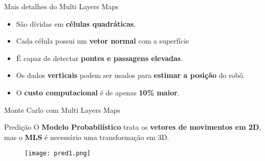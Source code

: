 

\begin{frame}[t]{Mais detalhes do Multi Layers Maps}

    
    \begin{itemize}
        \item São dívidas em \textbf{células quadráticas}.
        \item Cada célula possui um \textbf{vetor normal} com a superfície
        \item É capaz de detectar \textbf{pontes e passagens elevadas}.
        \item Os dados \textbf{verticais} podem ser usados para \textbf{estimar a posição} do robô.
        \item O \textbf{custo computacional} é de apenas \textbf{10\% maior}. 
     
    \end{itemize}

\end{frame}


\begin{frame}[c]{Monte Carlo com Multi Layers Maps} 
    \transdissolve[duration=0.5]
   
    \begin{center}
    \end{center}
    
   
%
\end{frame}


\begin{frame}[t]{Predição}
    O \textbf{Modelo Probabilístico} trata os \textbf{vetores de movimentos em 2D}, mas  o \textbf{MLS} é necessário uma transformação em 3D.
    
    \begin{figure}

        \texttt{[image: pred1.png]}%
        
    
    \end{figure}
\end{frame}

